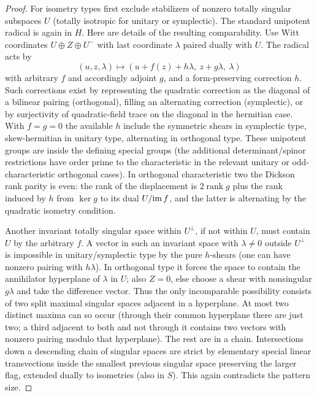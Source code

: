 \begin{proof}
For isometry types first exclude stabilizers of nonzero totally singular subspaces \(U\) (totally isotropic for unitary or symplectic). The standard unipotent radical is again in \(H\). Here are details of the resulting comparability. Use Witt coordinates \(U\oplus Z\oplus U^-\) with last coordinate \(\lambda\) paired dually with \(U\). The radical acts by
\[
 (u,z,\lambda)\mapsto (u+f(z)+h\lambda,\ z+g\lambda,\ \lambda)
\]
with arbitrary \(f\) and accordingly adjoint \(g\), and a form-preserving correction \(h\). Such corrections exist by representing the quadratic correction as the diagonal of a bilinear pairing (orthogonal), filling an alternating correction (symplectic), or by surjectivity of quadratic-field trace on the diagonal in the hermitian case. With \(f=g=0\) the available \(h\) include the symmetric shears in symplectic type, skew-hermitian in unitary type, alternating in orthogonal type. These unipotent groups are inside the defining special groups (the additional determinant/spinor restrictions have order prime to the characteristic in the relevant unitary or odd-characteristic orthogonal cases). In orthogonal characteristic two the Dickson rank parity is even: the rank of the displacement is \(2\operatorname{rank}g\) plus the rank induced by \(h\) from \(\ker g\) to its dual \(U/{\rm im}\,f\), and the latter is alternating by the quadratic isometry condition.

Another invariant totally singular space within \(U^\perp\), if not within \(U\), must contain \(U\) by the arbitrary \(f\). A vector in such an invariant space with \(\lambda\ne0\) outside \(U^\perp\) is impossible in unitary/symplectic type by the pure \(h\)-shears (one can have nonzero pairing with \(h\lambda\)). In orthogonal type it forces the space to contain the annihilator hyperplane of \(\lambda\) in \(U\); also \(Z=0\), else choose a shear with nonsingular \(g\lambda\) and take the difference vector. Thus the only incomparable possibility consists of two split maximal singular spaces adjacent in a hyperplane. At most two distinct maxima can so occur (through their common hyperplane there are just two; a third adjacent to both and not through it contains two vectors with nonzero pairing modulo that hyperplane). The rest are in a chain. Intersections down a descending chain of singular spaces are strict by elementary special linear transvections inside the smallest previous singular space preserving the larger flag, extended dually to isometries (also in \(S\)). This again contradicts the pattern size.


\end{proof}

